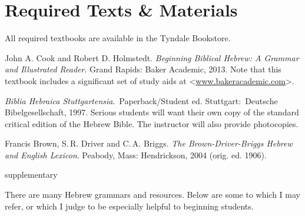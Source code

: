 \documentclass[titlepage]{article}
\newcommand\incl{../includes}
\begin{document}


\section{Required Texts \& Materials}
\label{texts}

All required textbooks are available in the Tyndale Bookstore.

\begingroup
\renewcommand{\section}[2]{}%
\begin{thebibliography}{BBH}%

    John A. Cook and Robert D. Holmstedt. \emph{Beginning Biblical Hebrew: A
    Grammar and Illustrated Reader}. Grand Rapids: Baker Academic, 2013. Note
    that this textbook includes a significant set of study aids at
    <\href{http://bakerpublishinggroup.com/books/beginning-biblical-hebrew/342630/esources}{www.bakeracademic.com}>.

    \emph{Biblia Hebraica Stuttgartensia}. Paperback\slash Student ed.
    Stuttgart: Deutsche Bibel\-ge\-sell\-schaft, 1997. Serious students
    will want their own copy of the standard critical edition of the
    Hebrew Bible. The instructor will also provide photocopies.

    Francis Brown, S.\,R. Driver and C.\,A. Briggs. \emph{The
    Brown-Driver-Briggs Hebrew and English Lexicon}. Peabody, Mass:
    Hendrickson, 2004 (orig. ed. 1906).

\end{thebibliography}
\endgroup

\section{Supplementary Texts}
\label{supplementary}

There are many Hebrew grammars and resources. Below are some to which
I may refer, or which I judge to be especially helpful to beginning
students.
\end{document}
